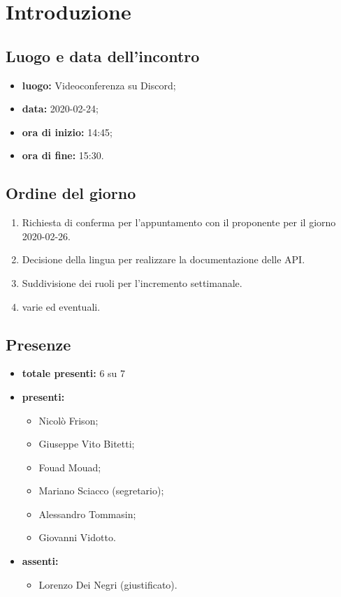 \section*{Introduzione}

\subsection*{Luogo e data dell'incontro}
	\begin{itemize}
		\item \textbf{luogo:} Videoconferenza su Discord;
		\item \textbf{data:} 2020-02-24;
		\item \textbf{ora di inizio:} 14:45;
		\item \textbf{ora di fine:} 15:30.
	\end{itemize}

\subsection*{Ordine del giorno}
	\begin{enumerate}
			\item Richiesta di conferma per l'appuntamento con il proponente per il giorno 2020-02-26.
			\item Decisione della lingua per realizzare la documentazione delle API.
			\item Suddivisione dei ruoli per l'incremento settimanale.
  			\item varie ed eventuali.
	\end{enumerate}

\subsection*{Presenze}
	\begin{itemize}
		\item \textbf{totale presenti:} 6 su 7
		\item \textbf{presenti: }
			\begin{itemize}			
				\item Nicolò Frison;
				\item Giuseppe Vito Bitetti;
				\item Fouad Mouad;
				\item Mariano Sciacco (segretario);
				\item Alessandro Tommasin;
				\item Giovanni Vidotto.
			\end{itemize}
		\item \textbf{assenti: } 
			\begin{itemize}	
				\item Lorenzo Dei Negri (giustificato).
			\end{itemize}
	\end{itemize}


